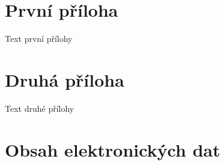 \documentclass[
  biblatex,
  seconds=true,
  language=slovak,
  figures=false,
  glossaries,
  index
]{kidiplom}
\begin{document}
\appendix

\section{První příloha}
Text první přílohy

\section{Druhá příloha}
Text druhé přílohy

\section{Obsah elektronických dat} \label{sec:ObsahData}




\printglossary


\nocite{*}
\printbibliography

%
%

\printindex
\end{document}
